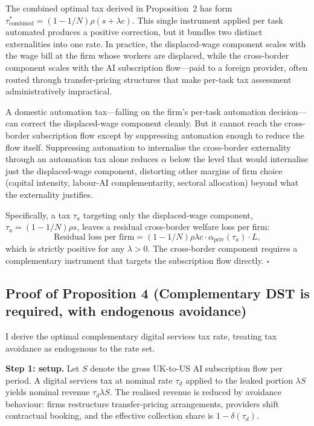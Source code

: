 \documentclass[11pt,letterpaper]{article}
\theoremstyle{remark}
\begin{document}
The combined optimal tax derived in Proposition~2 has form $\tau^*_{\text{combined}} = (1 - 1/N) \rho (s + \lambda c)$. This single instrument applied per task automated produces a positive correction, but it bundles two distinct externalities into one rate. In practice, the displaced-wage component scales with the wage bill at the firm whose workers are displaced, while the cross-border component scales with the AI subscription flow---paid to a foreign provider, often routed through transfer-pricing structures that make per-task tax assessment administratively impractical.

A domestic automation tax---falling on the firm's per-task automation decision---can correct the displaced-wage component cleanly. But it cannot reach the cross-border subscription flow except by suppressing automation enough to reduce the flow itself. Suppressing automation to internalise the cross-border externality through an automation tax alone reduces $\alpha$ below the level that would internalise just the displaced-wage component, distorting other margins of firm choice (capital intensity, labour-AI complementarity, sectoral allocation) beyond what the externality justifies.

Specifically, a tax $\tau_a$ targeting only the displaced-wage component, $\tau_a = (1 - 1/N) \rho s$, leaves a residual cross-border welfare loss per firm:
\[
\text{Residual loss per firm} = (1 - 1/N) \rho \lambda c \cdot \alpha_{\text{priv}}(\tau_a) \cdot L,
\]
which is strictly positive for any $\lambda > 0$. The cross-border component requires a complementary instrument that targets the subscription flow directly. \hfill$\square$

\subsection*{Proof of Proposition 4 (Complementary DST is required, with endogenous avoidance)}

I derive the optimal complementary digital services tax rate, treating tax avoidance as endogenous to the rate set.

\textbf{Step 1: setup.} Let $S$ denote the gross UK-to-US AI subscription flow per period. A digital services tax at nominal rate $\tau_d$ applied to the leaked portion $\lambda S$ yields nominal revenue $\tau_d \lambda S$. The realised revenue is reduced by avoidance behaviour: firms restructure transfer-pricing arrangements, providers shift contractual booking, and the effective collection share is $1 - \delta(\tau_d)$.
\end{document}

